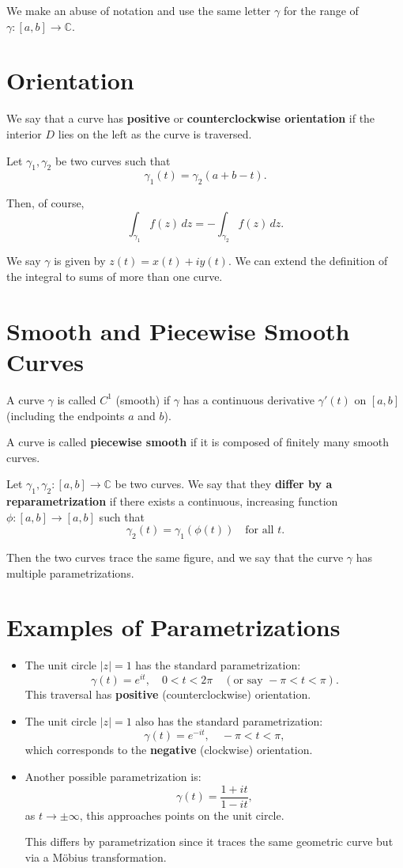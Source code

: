 \documentclass[12pt]{article}
\theoremstyle{definition} %
\theoremstyle{plain} %
\begin{document}
We make an abuse of notation and use the same letter $\gamma$ for the range of $\gamma: [a, b] \to \mathbb{C}$.

\section*{Orientation}

We say that a curve has \textbf{positive} or \textbf{counterclockwise orientation} if the interior $D$ lies on the left as the curve is traversed.

Let $\gamma_1, \gamma_2$ be two curves such that
\[
\gamma_1(t) = \gamma_2(a + b - t).
\]

Then, of course,
\[
\int_{\gamma_1} f(z)\,dz = -\int_{\gamma_2} f(z)\,dz.
\]

We say $\gamma$ is given by $z(t) = x(t) + iy(t)$. We can extend the definition of the integral to sums of more than one curve.

\section*{Smooth and Piecewise Smooth Curves}

A curve $\gamma$ is called $C^1$ (smooth) if $\gamma$ has a continuous derivative $\gamma'(t)$ on $[a, b]$ (including the endpoints $a$ and $b$).

A curve is called \textbf{piecewise smooth} if it is composed of finitely many smooth curves.

Let $\gamma_1, \gamma_2: [a,b] \to \mathbb{C}$ be two curves. We say that they \textbf{differ by a reparametrization} if there exists a continuous, increasing function $\phi : [a,b] \to [a,b]$ such that
\[
\gamma_2(t) = \gamma_1(\phi(t)) \quad \text{for all } t.
\]

Then the two curves trace the same figure, and we say that the curve $\gamma$ has multiple parametrizations.

\section*{Examples of Parametrizations}

\begin{itemize}
    \item The unit circle $|z| = 1$ has the standard parametrization:
    \[
    \gamma(t) = e^{it}, \quad 0 < t < 2\pi \quad (\text{or say } -\pi < t < \pi).
    \]
    This traversal has \textbf{positive} (counterclockwise) orientation.
    
    \item The unit circle $|z| = 1$ also has the standard parametrization:
    \[
    \gamma(t) = e^{-it}, \quad -\pi < t < \pi,
    \]
    which corresponds to the \textbf{negative} (clockwise) orientation.

    \item Another possible parametrization is:
    \[
    \gamma(t) = \frac{1 + it}{1 - it},
    \]
    as $t \to \pm \infty$, this approaches points on the unit circle.
    
    This differs by parametrization since it traces the same geometric curve but via a Möbius transformation.
\end{itemize}
\end{document}
